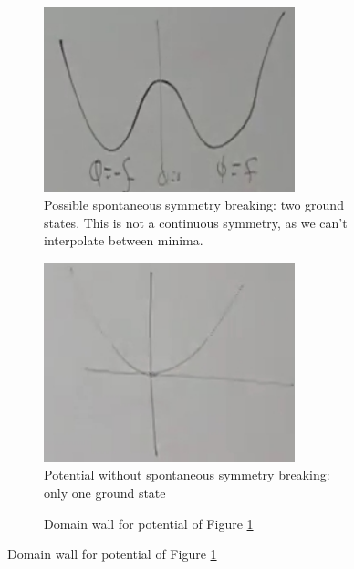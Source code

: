 \documentclass[]{article}
\begin{document}
\begin{figure}[H]
	\caption[$V(\Phi)$ with and without spontaneous symmetry breaking]{Potential for (\ref{eq:spontaneous:symmetry:L}), with and without spontaneous symmetry breaking}
	\begin{subfigure}[t]{0.45\textwidth}
		\vskip 0pt
		\caption{Possible spontaneous symmetry breaking: two ground states. This is not a continuous symmetry, as we can't interpolate between minima.}\label{fig:2-7-V}
		\includegraphics[width=0.8\textwidth]{2-7-V}
	\end{subfigure}
	\hfill
	\begin{subfigure}[t]{0.45\textwidth}
		\vskip 0pt
		\caption{Potential without spontaneous symmetry breaking: only one ground state}\label{fig:2-7-V-simple}
		\includegraphics[width=0.8\textwidth]{2-7-V-simple}
	\end{subfigure}
	\hfill
	\begin{subfigure}[t]{0.9\textwidth}
		\begin{center}
			\caption{Domain wall for potential of Figure \ref{fig:2-7-V}}\label{fig:2-7-V-domain-wall}

\end{center}
\end{subfigure}
\end{figure}
\end{document}
